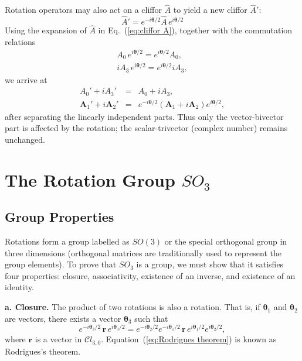 \documentclass[11pt,twocolumn]{article}
\begin{document}
Rotation operators may also act on a cliffor $\hat A$ to yield a new cliffor $\hat A'$:
\begin{equation}
\label{eq:A' is rotate A}
\hat A'=e^{-i\bm\theta/2}\hat A\,e^{i\bm\theta/2}
\end{equation}
Using the expansion of $\hat A$ in Eq.~(\ref{eq:cliffor A}), together with the commutation relations
\begin{eqnarray}
\label{eq:A_0 exp commute}
A_0\, e^{i\bm\theta/2}=e^{i\bm\theta/2}A_0,\\
\label{eq:iA_3 exp commute}
iA_3\, e^{i\bm\theta/2}=e^{i\bm\theta/2}iA_3,
\end{eqnarray}
we arrive at
\begin{eqnarray}
\label{eq:A' is rotate A scalar-trivector}
A_0'+iA_3'&=&A_0+iA_3,\\
\label{eq:A' is rotate A vector-bivector}
\mathbf A_1'+i\mathbf A_2'&=&e^{-i\bm\theta/2}(\mathbf A_1+i\mathbf A_2)e^{i\bm\theta/2},
\end{eqnarray}
after separating the linearly independent parts.  Thus only the vector-bivector part is affected by the rotation; the scalar-trivector (complex number) remains unchanged.


\section{The Rotation Group $SO_3$}

\subsection{Group Properties}

Rotations form a group labelled as $SO(3)$ or the special orthogonal group in three dimensions (orthogonal matrices are traditionally used to represent the group elements).  To prove that $SO_3$ is a group, we must show that it satisfies four properties: closure, associativity, existence of an inverse, and existence of an identity.\cite{Hestenes_1990_NewFoundationsforClassicalMechanics_p298}  
\medskip

\textbf{a.  Closure.}  The product of two rotations is also a rotation.  That is, if $\bm\theta_1$ and $\bm\theta_2$ are vectors, there exists a vector $\bm\theta_3$ such that
\begin{equation}
\label{eq:Rodrigues theorem}
e^{-i\bm\theta_3/2}\,\mathbf r\,e^{i\bm\theta_3/2}=e^{-i\bm\theta_2/2}e^{-i\bm\theta_1/2}\,\mathbf r\,e^{i\bm\theta_1/2}e^{i\bm\theta_2/2},
\end{equation}
where $\mathbf r$ is a vector in $\mathcal Cl_{3,0}$. Equation~(\ref{eq:Rodrigues theorem}) is known as Rodrigues's theorem. 
\end{document}
